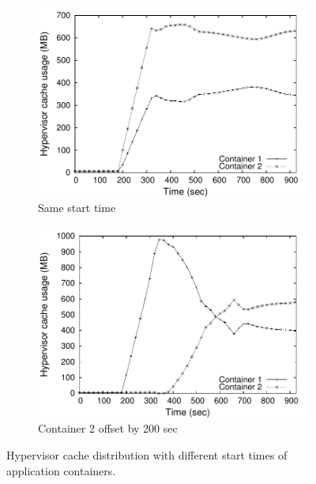 \begin{figure}
\centering
\begin{subfigure}{0.49\columnwidth}
\includegraphics[width=\columnwidth]{data/motivation/disparity1}
 \caption{Same start time}
 \label{fig:cachedistrib12} 
\end{subfigure} \hfill
%
\begin{subfigure}{0.49\columnwidth}
\includegraphics[width=\columnwidth]{data/motivation/disparity2}
 \caption{Container 2 offset by 200 sec}
 \label{fig:cachedistrib12_offset} 
\end{subfigure} \hfill
%
\caption{Hypervisor cache distribution with different start times of
application containers.}
\vspace{-0.4cm}
\label{fig:together}
\end{figure}



